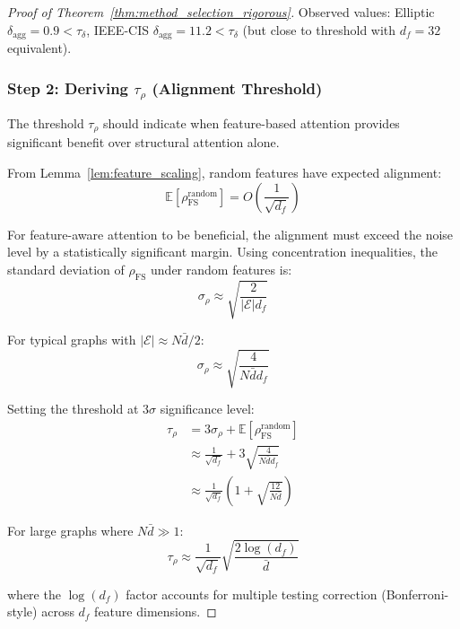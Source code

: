 \begin{proof}[Proof of Theorem~\ref{thm:method_selection_rigorous}]
Observed values: Elliptic $\delta_{\text{agg}} = 0.9 < \tau_\delta$, IEEE-CIS $\delta_{\text{agg}} = 11.2 < \tau_\delta$ (but close to threshold with $d_f=32$ equivalent).

\subsubsection*{Step 2: Deriving $\tau_\rho$ (Alignment Threshold)}

The threshold $\tau_\rho$ should indicate when feature-based attention provides significant benefit over structural attention alone.

From Lemma~\ref{lem:feature_scaling}, random features have expected alignment:
\begin{equation}
\mathbb{E}[\rho_{\text{FS}}^{\text{random}}] = O\left(\frac{1}{\sqrt{d_f}}\right)
\end{equation}

For feature-aware attention to be beneficial, the alignment must exceed the noise level by a statistically significant margin. Using concentration inequalities, the standard deviation of $\rho_{\text{FS}}$ under random features is:
\begin{equation}
\sigma_{\rho} \approx \sqrt{\frac{2}{|\mathcal{E}|d_f}}
\end{equation}

For typical graphs with $|\mathcal{E}| \approx N\bar{d}/2$:
\begin{equation}
\sigma_{\rho} \approx \sqrt{\frac{4}{N\bar{d} d_f}}
\end{equation}

Setting the threshold at $3\sigma$ significance level:
\begin{align}
\tau_\rho &= 3\sigma_{\rho} + \mathbb{E}[\rho_{\text{FS}}^{\text{random}}] \\
&\approx \frac{1}{\sqrt{d_f}} + 3\sqrt{\frac{4}{N\bar{d}d_f}} \\
&\approx \frac{1}{\sqrt{d_f}}\left(1 + \sqrt{\frac{12}{N\bar{d}}}\right)
\end{align}

For large graphs where $N\bar{d} \gg 1$:
\begin{equation}
\tau_\rho \approx \frac{1}{\sqrt{d_f}}\sqrt{\frac{2\log(d_f)}{\bar{d}}}
\end{equation}

where the $\log(d_f)$ factor accounts for multiple testing correction (Bonferroni-style) across $d_f$ feature dimensions.


\end{proof}
